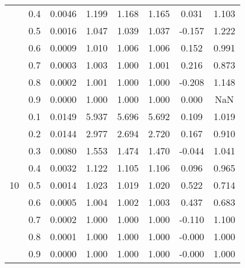 \documentclass[11pt,a4paper]{report}
\begin{document}
\begin{longtable}{ | c | c || c | c | c | c | c | c | }
 & 0.4 & 0.0046 & 1.199 & 1.168 & 1.165 & 0.031 & 1.103 \\
 & 0.5 & 0.0016 & 1.047 & 1.039 & 1.037 & -0.157 & 1.222 \\
 & 0.6 & 0.0009 & 1.010 & 1.006 & 1.006 & 0.152 & 0.991 \\
 & 0.7 & 0.0003 & 1.003 & 1.000 & 1.001 & 0.216 & 0.873 \\
 & 0.8 & 0.0002 & 1.001 & 1.000 & 1.000 & -0.208 & 1.148 \\
 & 0.9 & 0.0000 & 1.000 & 1.000 & 1.000 & 0.000 & NaN \\
 \hline
\multirow{9}{*}{10} & 0.1 & 0.0149 & 5.937 & 5.696 & 5.692 & 0.109 & 1.019 \\
 & 0.2 & 0.0144 & 2.977 & 2.694 & 2.720 & 0.167 & 0.910 \\
 & 0.3 & 0.0080 & 1.553 & 1.474 & 1.470 & -0.044 & 1.041 \\
 & 0.4 & 0.0032 & 1.122 & 1.105 & 1.106 & 0.096 & 0.965 \\
 & 0.5 & 0.0014 & 1.023 & 1.019 & 1.020 & 0.522 & 0.714 \\
 & 0.6 & 0.0005 & 1.004 & 1.002 & 1.003 & 0.437 & 0.683 \\
 & 0.7 & 0.0002 & 1.000 & 1.000 & 1.000 & -0.110 & 1.100 \\
 & 0.8 & 0.0001 & 1.000 & 1.000 & 1.000 & -0.000 & 1.000 \\
 & 0.9 & 0.0000 & 1.000 & 1.000 & 1.000 & -0.000 & 1.000 \\
 \hline
\hline
\end{longtable}
\end{document}
